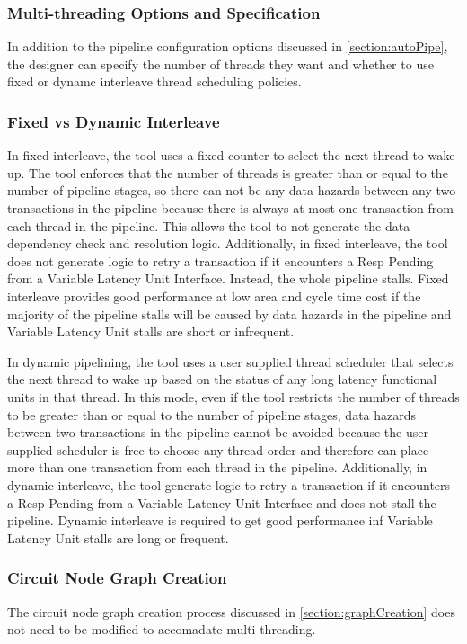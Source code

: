 \subsubsection{Multi-threading Options and Specification}
In addition to the pipeline configuration options discussed in \ref{section:autoPipe}, the designer can specify the number of threads they want and whether to use fixed or dynamc interleave thread scheduling policies. 

\subsubsection{Fixed vs Dynamic Interleave}
In fixed interleave, the tool uses a fixed counter to select the next thread to wake up. The tool enforces that the number of threads is greater than or equal to the number of pipeline stages, so there can not be any data hazards between any two transactions in the pipeline because there is always at most one transaction from each thread in the pipeline. This allows the tool to not generate the data dependency check and resolution logic. Additionally, in fixed interleave, the tool does not generate logic to retry a transaction if it encounters a Resp Pending from a Variable Latency Unit Interface. Instead, the whole pipeline stalls. Fixed interleave provides good performance at low area and cycle time cost if the majority of the pipeline stalls will be caused by data hazards in the pipeline and Variable Latency Unit stalls are short or infrequent.

In dynamic pipelining, the tool uses a user supplied thread scheduler that selects the next thread to wake up based on the status of any long latency functional units in that thread. In this mode, even if the tool restricts the number of threads to be greater than or equal to the number of pipeline stages, data hazards between two transactions in the pipeline cannot be avoided because the user supplied scheduler is free to choose any thread order and therefore can place more than one transaction from each thread in the pipeline. Additionally, in dynamic interleave, the tool generate logic to retry a transaction if it encounters a Resp Pending from a Variable Latency Unit Interface and does not stall the pipeline. Dynamic interleave is required to get good performance inf Variable Latency Unit stalls are long or frequent.

\subsubsection{Circuit Node Graph Creation}
The circuit node graph creation process discussed in \ref{section:graphCreation} does not need to be modified to accomadate multi-threading.

